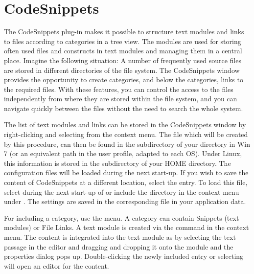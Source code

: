 \section{CodeSnippets}\label{sec:codesnippets}

The CodeSnippets plug-in makes it possible to structure text modules and links to files according to categories in a tree view. The modules are used for storing often used files and constructs in text modules and managing them in a central place. Imagine the following situation: A number of frequently used source files are stored in different directories of the file system. The CodeSnippets window provides the opportunity to create categories, and below the categories, links to the required files. With these features, you can control the access to the files independently from where they are stored within the file system, and you can navigate quickly between the files without the need to search the whole system.


The list of text modules and links can be stored in the CodeSnippets window by right-clicking and selecting  from the context menu. The file  which will be created by this procedure, can then be found in the  subdirectory of your  directory in Win 7 (or an equivalent path in the user profile, adapted to each OS). Under Linux, this information is stored in the  subdirectory of your HOME directory. The \codeblocks configuration files will be loaded during the next start-up. If you wish to save the content of CodeSnippets at a different location, select the  entry. To load this file, select  during the next start-up of \codeblocks or include the directory in the  context menu under . The settings are saved in the corresponding file  in your application data.

For including a category, use the  menu. A category can contain Snippets (text modules) or File Links. A text module is created via the  command in the context menu. The content is integrated into the text module as  by selecting the text passage in the \codeblocks editor and dragging and dropping it onto the module and the properties dialog pops up. Double-clicking the newly included entry or selecting  will open an editor for the content.

